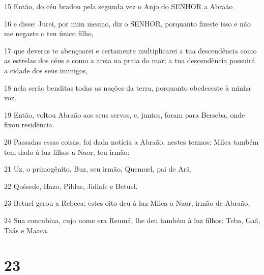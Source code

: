 \par 15 Então, do céu bradou pela segunda vez o Anjo do SENHOR a Abraão
\par 16 e disse: Jurei, por mim mesmo, diz o SENHOR, porquanto fizeste isso e não me negaste o teu único filho,
\par 17 que deveras te abençoarei e certamente multiplicarei a tua descendência como as estrelas dos céus e como a areia na praia do mar; a tua descendência possuirá a cidade dos seus inimigos,
\par 18 nela serão benditas todas as nações da terra, porquanto obedeceste à minha voz.
\par 19 Então, voltou Abraão aos seus servos, e, juntos, foram para Berseba, onde fixou residência.
\par 20 Passadas essas coisas, foi dada notícia a Abraão, nestes termos: Milca também tem dado à luz filhos a Naor, teu irmão:
\par 21 Uz, o primogênito, Buz, seu irmão, Quemuel, pai de Arã,
\par 22 Quésede, Hazo, Pildas, Jidlafe e Betuel.
\par 23 Betuel gerou a Rebeca; estes oito deu à luz Milca a Naor, irmão de Abraão.
\par 24 Sua concubina, cujo nome era Reumá, lhe deu também à luz filhos: Teba, Gaã, Taás e Maaca.

\chapter{23}

